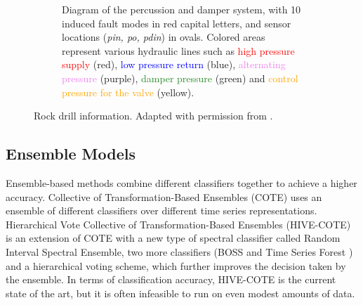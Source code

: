 \begin{figure}[!hbt]
\begin{center}
\begin{subfigure}[t]{0.6\linewidth}
        \caption{Diagram of the percussion and damper system, with 10 induced fault modes in red capital letters, and sensor locations (\textit{pin, po, pdin}) in ovals. Colored areas represent various hydraulic lines such as \textcolor{red}{high pressure supply} (red), \textcolor{blue}{low pressure return} (blue), \textcolor{violet}{alternating pressure} (purple), \textcolor{ForestGreen}{damper pressure} (green) and \textcolor{orange}{control pressure for the valve} (yellow).}
        \label{fig:phm_3}
    \end{subfigure}
    \caption{Rock drill information. Adapted with permission from \cite{jakobsson2022dataset}.}
    \label{fig:phm_1_3}
  \end{center}
\end{figure}


\subsection{Ensemble Models}

Ensemble-based methods combine different classifiers together to achieve a higher accuracy. Collective of Transformation-Based Ensembles (COTE) \cite{bagnall2015time} uses an ensemble of different classifiers over different time series representations.
Hierarchical Vote Collective of Transformation-Based Ensembles (HIVE-COTE) \cite{lines2018time} is an extension of COTE with a new type of spectral classifier called Random Interval Spectral Ensemble, two more classifiers (BOSS \cite{schafer2015boss} and Time Series Forest \cite{deng2013time}) and a hierarchical voting scheme, which further improves the decision taken by the ensemble.
In terms of classification accuracy, HIVE-COTE is the current state of the art, but it is often infeasible to run on even modest amounts of data. 






